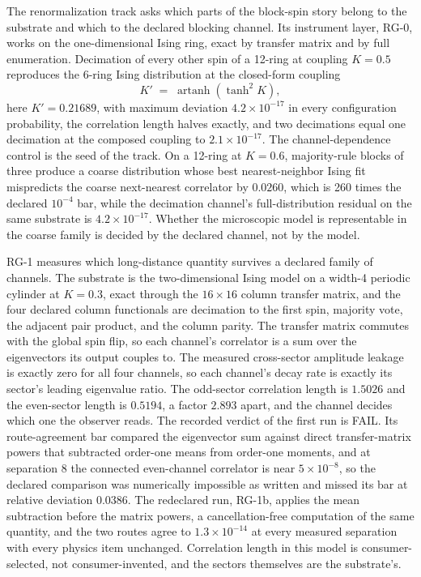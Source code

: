 \documentclass[aps,pre,reprint,nofootinbib,floatfix]{revtex4-2}
\begin{document}
The renormalization track asks which parts of the block-spin story
belong to the substrate and which to the declared blocking
channel.  Its instrument layer, RG-0, works on the one-dimensional
Ising ring, exact by transfer matrix and by full enumeration.
Decimation of every other spin of a 12-ring at coupling $K=0.5$
reproduces the 6-ring Ising distribution at the closed-form
coupling
\begin{equation}
  K' \;=\; \operatorname{artanh}\!\left(\tanh^2 K\right),
  \label{eq:decimation}
\end{equation}
here $K' = 0.21689$, with maximum deviation $4.2\times10^{-17}$ in
every configuration probability, the correlation length halves
exactly, and two decimations equal one decimation at the composed
coupling to $2.1\times10^{-17}$.  The channel-dependence control is
the seed of the track.  On a 12-ring at $K=0.6$, majority-rule
blocks of three produce a coarse distribution whose best
nearest-neighbor Ising fit mispredicts the coarse next-nearest
correlator by $0.0260$, which is 260 times the declared $10^{-4}$
bar, while the decimation channel's full-distribution residual on
the same substrate is $4.2\times10^{-17}$.  Whether the microscopic model is
representable in the coarse family is decided by the declared
channel, not by the model.

RG-1 measures which long-distance quantity survives a declared
family of channels.  The substrate is the two-dimensional Ising
model on a width-4 periodic cylinder at $K=0.3$, exact through the
$16\times16$ column transfer matrix, and the four declared column
functionals are decimation to the first spin, majority vote, the
adjacent pair product, and the column parity.  The transfer matrix
commutes with the global spin flip, so each channel's correlator is
a sum over the eigenvectors its output couples to.  The measured
cross-sector amplitude leakage is exactly zero for all four
channels, so each channel's decay rate is exactly its sector's
leading eigenvalue ratio.  The odd-sector correlation length is
$1.5026$ and the even-sector length is $0.5194$, a factor $2.893$
apart, and the channel decides which one the observer reads.  The
recorded verdict of the first run is FAIL.  Its route-agreement bar
compared the eigenvector sum against direct transfer-matrix powers
that subtracted order-one means from order-one moments, and at
separation 8 the connected even-channel correlator is near
$5\times10^{-8}$, so the declared comparison was numerically
impossible as written and missed its bar at relative deviation
$0.0386$.  The redeclared run, RG-1b, applies the mean subtraction
before the matrix powers, a cancellation-free computation of the
same quantity, and the two routes agree to $1.3\times10^{-14}$ at
every measured separation with every physics item unchanged.
Correlation length in this model is consumer-selected, not
consumer-invented, and the sectors themselves are the substrate's.
\end{document}
